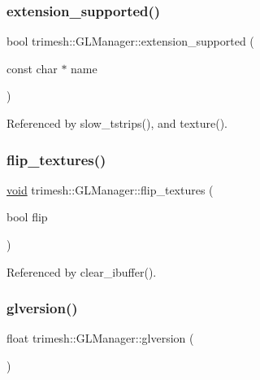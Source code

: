 \mbox{\label{classtrimesh_1_1GLManager_ada2891df7aa4c4566eeeadd2009b6b9c}} 
\subsubsection{\texorpdfstring{extension\+\_\+supported()}{extension\_supported()}}
{\footnotesize\ttfamily bool trimesh\+::\+G\+L\+Manager\+::extension\+\_\+supported (\begin{DoxyParamCaption}\item[{const char $\ast$}]{name }\end{DoxyParamCaption})}



Referenced by slow\+\_\+tstrips(), and texture().

\mbox{\label{classtrimesh_1_1GLManager_ab19ed37d7918772bb60e2acb445da300}} 
\subsubsection{\texorpdfstring{flip\+\_\+textures()}{flip\_textures()}}
{\footnotesize\ttfamily \hyperlink{namespacetrimesh_a784ddfd979e1c579bda795a8edfc3f43}{void} trimesh\+::\+G\+L\+Manager\+::flip\+\_\+textures (\begin{DoxyParamCaption}\item[{bool}]{flip }\end{DoxyParamCaption})}



Referenced by clear\+\_\+ibuffer().

\mbox{\label{classtrimesh_1_1GLManager_aeeceda504719cddfd792f3f45c060d62}} 
\subsubsection{\texorpdfstring{glversion()}{glversion()}}
{\footnotesize\ttfamily float trimesh\+::\+G\+L\+Manager\+::glversion (\begin{DoxyParamCaption}{ }\end{DoxyParamCaption})}



